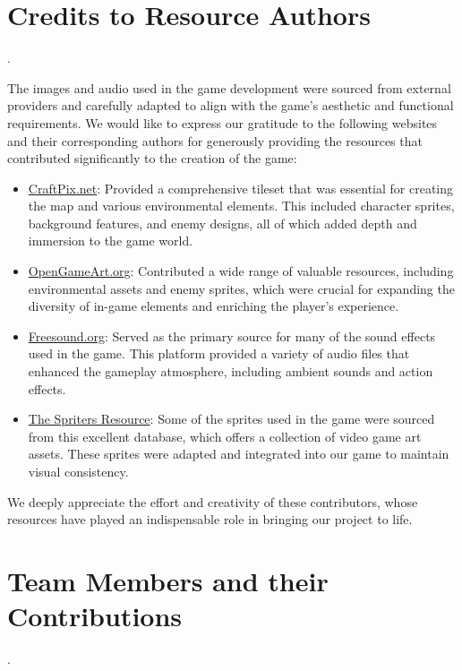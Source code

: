 \documentclass[a4paper,12pt]{article}
\begin{document}
\section*{Credits to Resource Authors}
.

The images and audio used in the game development were sourced from external providers and carefully adapted to align with the game's aesthetic and functional requirements. We would like to express our gratitude to the following websites and their corresponding authors for generously providing the resources that contributed significantly to the creation of the game:

\begin{itemize}
    \item \href{https://craftpix.net}{CraftPix.net}: Provided a comprehensive tileset that was essential for creating the map and various environmental elements. This included character sprites, background features, and enemy designs, all of which added depth and immersion to the game world.

    \item \href{https://opengameart.org}{OpenGameArt.org}: Contributed a wide range of valuable resources, including environmental assets and enemy sprites, which were crucial for expanding the diversity of in-game elements and enriching the player's experience.

    \item \href{https://freesound.org}{Freesound.org}: Served as the primary source for many of the sound effects used in the game. This platform provided a variety of audio files that enhanced the gameplay atmosphere, including ambient sounds and action effects.

    \item \href{https://www.spriters-resource.com}{The Spriters Resource}: Some of the sprites used in the game were sourced from this excellent database, which offers a collection of video game art assets. These sprites were adapted and integrated into our game to maintain visual consistency.

\end{itemize}

We deeply appreciate the effort and creativity of these contributors, whose resources have played an indispensable role in bringing our project to life.


\section*{Team Members and their Contributions}
.
\end{document}
